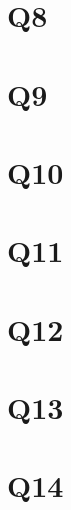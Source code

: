 \documentclass[11pt]{article}
\begin{document}
\section*{Q8}
\section*{Q9}
\section*{Q10}
\section*{Q11}
\section*{Q12}
\section*{Q13}
\section*{Q14}
\end{document}
